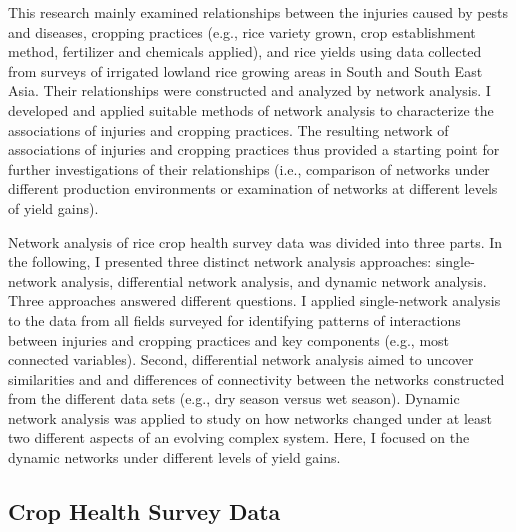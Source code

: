 This research mainly examined relationships between the injuries caused by pests and diseases, cropping practices (e.g., rice variety grown, crop establishment method, fertilizer and chemicals applied), and rice yields using data collected from surveys of irrigated lowland rice growing areas in South and South East Asia. Their relationships were constructed and analyzed by network analysis. I developed and applied suitable methods of network analysis to characterize the associations of injuries and cropping practices. The resulting network of associations of injuries and cropping practices thus provided a starting point for further investigations of their relationships (i.e., comparison of networks under different production environments or examination of networks at different levels of yield gains). 

Network analysis of rice crop health survey data was divided into three parts. In the following, I presented three distinct network analysis approaches: single-network analysis, differential network analysis, and dynamic network analysis. Three approaches answered different questions. I applied single-network analysis to the data from all fields surveyed for identifying patterns of interactions  between injuries and cropping practices and key components (e.g., most connected variables). Second, differential network analysis aimed to uncover similarities and  and differences of connectivity between the networks constructed from the different data sets (e.g., dry season versus wet season). Dynamic network analysis was applied to study on how networks changed under at least two different aspects of an evolving complex system. Here, I focused on the dynamic networks under different levels of yield gains. 

\subsection*{Crop Health Survey Data}

